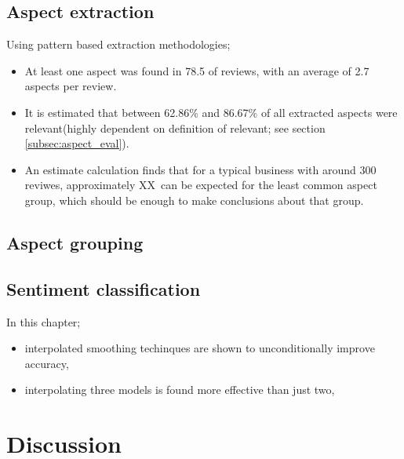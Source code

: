 \documentclass[a4paper,11pt]{kth-mag}
\newcommand{\numValueAspects}{XX}
\begin{document}
\subsection{Aspect extraction}
Using pattern based extraction methodologies;
\begin{itemize}
\item At least one aspect was found in 78.5 of reviews, with an average of 2.7 aspects per review.
\item It is estimated that between 62.86\% and 86.67\% of all extracted aspects were relevant(highly dependent on definition of relevant; see section \ref{subsec:aspect_eval}).

\item An estimate calculation finds that for a typical business with around 300 reviwes,
approximately \numValueAspects~can be expected for the least common aspect group, which should be enough to make conclusions about that group.
\end{itemize}


\subsection{Aspect grouping}


\subsection{Sentiment classification}
In this chapter;

\begin{itemize}
\item interpolated smoothing techinques are shown to unconditionally improve accuracy,
\item interpolating three models is found more effective than just two,
\end{itemize}



\section{Discussion}
\end{document}
